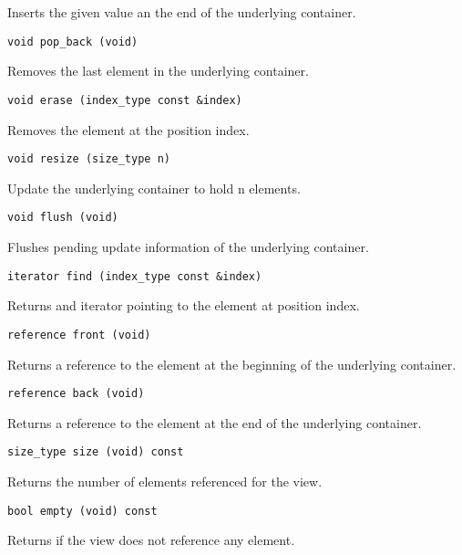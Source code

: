 Inserts the given value an the end of the underlying container.

\begin{verbatim}
void pop_back (void)
\end{verbatim}

Removes the last element in the underlying container.

\begin{verbatim}
void erase (index_type const &index)
\end{verbatim}

Removes the element at the position index.

\begin{verbatim}
void resize (size_type n)
\end{verbatim}

Update the underlying container to hold n elements.

\begin{verbatim}
void flush (void)
\end{verbatim}

Flushes pending update information of the underlying container.

\begin{verbatim}
iterator find (index_type const &index)
\end{verbatim}

Returns and iterator pointing to the element at position index.

\begin{verbatim}
reference front (void)
\end{verbatim}

Returns a reference to the element at the beginning of the underlying container.

\begin{verbatim}
reference back (void)
\end{verbatim}

Returns a reference to the element at the end of the underlying container.

\begin{verbatim}
size_type size (void) const
\end{verbatim}

Returns the number of elements referenced for the view.

\begin{verbatim}
bool empty (void) const
\end{verbatim}

Returns if the view does not reference any element.

